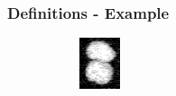 \begin{frame}
    \frametitle{Definitions - Example}
    \begin{minipage}[t][0.4\textheight][t]{\textwidth}%
        \begin{figure}%
            \centering%
            \begin{subfigure}[t]{0.23\textwidth}%
                \centering%
                \includegraphics[width=\textwidth]{images/joint/overseg/75/02/raw_contrast.png}
            \end{subfigure}%
            \hfill
            \begin{subfigure}[t]{0.23\textwidth}
                \centering
\end{subfigure}
\end{figure}
\end{minipage}
\end{frame}
